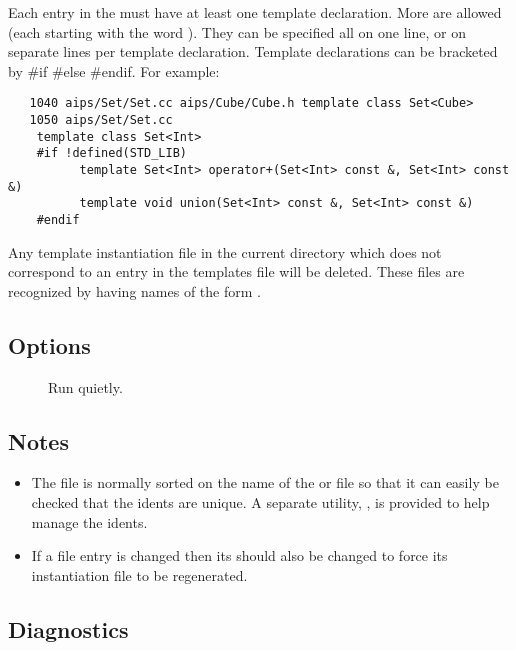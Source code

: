 Each entry in the  must have at least one template
declaration. More are allowed (each starting with the word
). They can be specified all on one line, or on separate lines
per template declaration. Template declarations can be bracketed by \#if
\#else \#endif. For example:

\begin{verbatim}
   1040 aips/Set/Set.cc aips/Cube/Cube.h template class Set<Cube>
   1050 aips/Set/Set.cc 
	template class Set<Int>
	#if !defined(STD_LIB)
    	  template Set<Int> operator+(Set<Int> const &, Set<Int> const &)
      	  template void union(Set<Int> const &, Set<Int> const &)
	#endif
\end{verbatim}

\noindent
Any template instantiation  file in the current directory which does
not correspond to an entry in the templates file will be deleted.  These files
are recognized by having names of the form .

\subsection*{Options}
 
\begin{description}
\item[]
   Run quietly.
\end{description}
 
\subsection*{Notes}
 
\begin{itemize}
\item
   The  file is normally sorted on the name of the 
   or  file so that it can easily be checked that the idents are
   unique.  A separate utility, , is provided to help manage
   the idents.
\item
   If a  file entry is changed then its  should
   also be changed to force its instantiation file to be regenerated.
\end{itemize}

\subsection*{Diagnostics}
 

